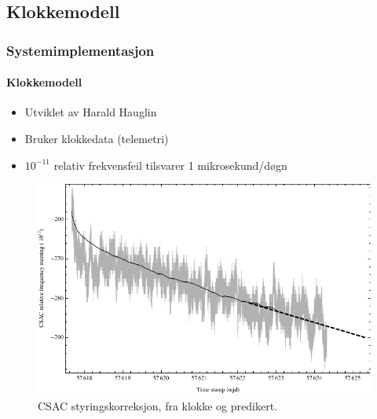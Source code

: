 \documentclass[xcolor=table]{beamer}
\begin{document}
\subsection{Klokkemodell}
\begin{frame}
\frametitle{Systemimplementasjon}
  \framesubtitle{Klokkemodell}
  \begin{itemize}
    \item Utviklet av Harald Hauglin
    \item Bruker klokkedata (telemetri)
    \item $10^{-11}$ relativ frekvensfeil tilsvarer 1 mikrosekund/døgn
  \end{itemize}
    \begin{figure}
        \includegraphics[scale=0.5]{thesis/graphics/csac_modelling_prediction.pdf}
      \caption{CSAC styringskorreksjon, fra klokke og predikert.}
    \end{figure}
\end{frame}
\end{document}

